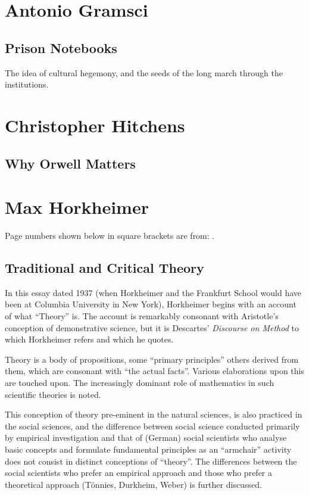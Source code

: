\documentclass[10pt,titlepage]{book}
\begin{document}
\section{Antonio Gramsci}

\subsection{Prison Notebooks \cite{gramsci-notes}}

The idea of cultural hegemony, and the seeds of the long march through the institutions.

\section{Christopher Hitchens}

\subsection{Why Orwell Matters\cite{hitchens-wom}}

\section{Max Horkheimer}

Page numbers shown below in square brackets are from: \cite{horkheimer-crit}.

\subsection{Traditional and Critical Theory}

In this essay \cite{horkheimer-trad, horkheimer-crit} dated 1937 (when Horkheimer and the Frankfurt School would have been at Columbia University in New York), Horkheimer begins with an account of what ``Theory'' is.
The account is remarkably consonant with Aristotle's conception of demonstrative science, but it is Descartes' \emph{Discourse on Method}\cite{descartesDOM} to which Horkheimer refers and which he quotes.

Theory is a body of propositions, some ``primary principles'' others derived from them, which are consonant with ``the actual facts''.
Various elaborations upon this are touched upon.
The increasingly dominant role of mathematics in such scientific theories is noted.

This conception of theory pre-eminent in the natural sciences, is also practiced in the social sciences, and the difference between social science conducted primarily by empirical investigation and that of (German) social scientists who analyse basic concepts and formulate fundamental principles as an ``armchair'' activity does not consist in distinct conceptions of ``theory''.
The differences between the social scientists who prefer an empirical approach and those who prefer a theoretical approach (T\"{o}nnies, Durkheim, Weber) is further discussed.
\end{document}
